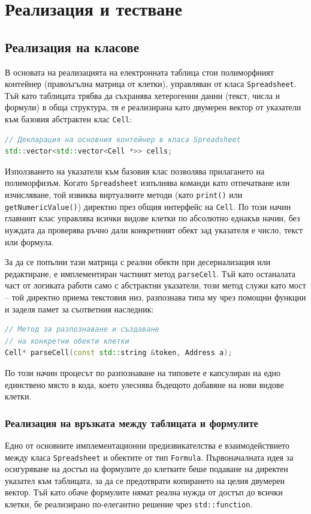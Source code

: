 \chapter{Реализация и тестване}

\section{Реализация на класове}
В основата на реализацията на електронната таблица стои полиморфният контейнер (правоъгълна матрица от клетки), управляван от класа \texttt{Spreadsheet}. Тъй като таблицата трябва да съхранява хетерогенни данни (текст, числа и формули) в обща структура, тя е реализирана като двумерен вектор от указатели към базовия абстрактен клас \texttt{Cell}:

\begin{lstlisting}[language=C++]
// Декларация на основния контейнер в класа Spreadsheet
std::vector<std::vector<Cell *>> cells;
\end{lstlisting}

Използването на указатели към базовия клас позволява прилагането на полиморфизъм. Когато \texttt{Spreadsheet} изпълнява команди като отпечатване или изчисляване, той извиква виртуалните методи (като \texttt{print()} или \texttt{getNumericValue()}) директно през общия интерфейс на \texttt{Cell}. По този начин главният клас управлява всички видове клетки по абсолютно еднакъв начин, без нуждата да проверява ръчно дали конкретният обект зад указателя е число, текст или формула.

За да се попълни тази матрица с реални обекти при десериализация или редактиране, е имплементиран частният метод \texttt{parseCell}. Тъй като останалата част от логиката работи само с абстрактни указатели, този метод служи като мост – той директно приема текстовия низ, разпознава типа му чрез помощни функции и заделя памет за съответния наследник:

\begin{lstlisting}[language=C++]
// Метод за разпознаване и създаване
// на конкретни обекти клетки
Cell* parseCell(const std::string &token, Address a);
\end{lstlisting}

По този начин процесът по разпознаване на типовете е капсулиран на едно единствено място в кода, което улеснява бъдещото добавяне на нови видове клетки.

\subsection*{Реализация на връзката между таблицата и формулите}
Едно от основните имплементационни предизвикателства е взаимодействието между класа \texttt{Spreadsheet} и обектите от тип \texttt{Formula}. Първоначалната идея за осигуряване на достъп на формулите до клетките беше подаване на директен указател към таблицата, за да се предотврати копирането на целия двумерен вектор. Тъй като обаче формулите нямат реална нужда от достъп до всички клетки, бе реализирано по-елегантно решение чрез \texttt{std::function}.

